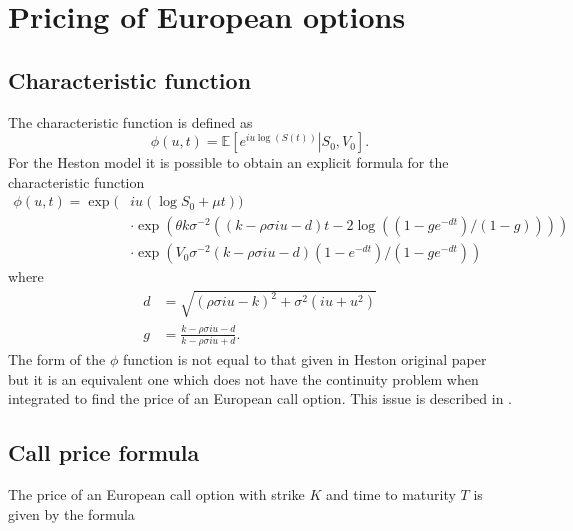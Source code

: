 \section{Pricing of European options}

\subsection{Characteristic function }

The characteristic function is defined as
\begin{equation}
\phi(u,t) = \mathbb{E} \left[\left.e^{iu\log(S(t))}\right|S_0,V_0\right].
\end{equation}
For the Heston model it is possible to obtain an explicit formula for the characteristic function
\begin{align}
\phi(u,t) = \exp( & iu(\log S_0 + \mu t)) \nonumber\\
 & \cdot\exp(\theta k \sigma^{-2}((k-\rho\sigma iu - d)t - 2\log( (1-ge^{-dt})/ (1-g) )))\nonumber\\
 & \cdot\exp(V_0\sigma^{-2}(k-\rho\sigma iu - d)(1-e^{-dt})/(1-ge^{-dt}))
\end{align}
where
\begin{align}
 d & = \sqrt{(\rho\sigma iu - k)^2 + \sigma^2(iu + u^2)} \\
 g & = \frac{k-\rho\sigma iu - d}{k-\rho\sigma iu + d}.
\end{align}
The form of the $\phi$ function is not equal to that given in Heston original paper but it is an equivalent one which does not have the continuity problem when integrated to find the price of an European call option. This issue is described in \cite{Albrecher:HestonTrap}.




\subsection{Call price formula}
\label{call}

The price of an European call option with strike $K$ and time to maturity $T$ is given by the formula

